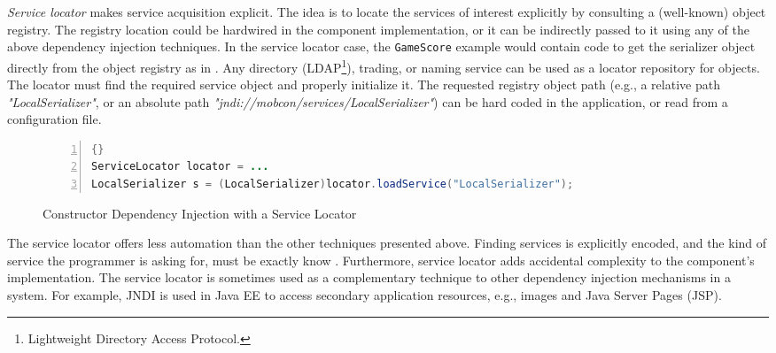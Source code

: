 \begin{dinglist}{43}

\item \textit{Service locator} makes service acquisition explicit. The idea is to locate the services of interest explicitly by consulting a (well-known) object registry. The registry location could be hardwired in the component implementation, or it can be indirectly passed to it using any of the above dependency injection techniques. In the service locator case, the  \texttt{Ga\-me\-Sco\-re} example would contain code to get the serializer object directly from the object registry as in . Any directory (LDAP\footnote{Lightweight Directory Access Protocol.}), trading, or naming service can be used as a locator repository for objects. The locator must find the required service object and properly initialize it. The requested registry object path (e.g., a relative path \textit{"Lo\-cal\-Se\-ria\-li\-zer"}, or an absolute path \textit{"jndi://mobcon/services/LocalSerializer"}) can be hard coded in the application, or read from a configuration file.

\begin{figure}[ht]
	\centering
	\begin{minipage}[b]{12cm}
	\begin{center}	
\begin{scriptsize}
\begin{lstlisting}[numbers=left,language=Java,frame=leftline]{}
ServiceLocator locator = ...
LocalSerializer s = (LocalSerializer)locator.loadService("LocalSerializer");
		\end{lstlisting}
		\end{scriptsize}
	\end{center}
	\caption{Constructor Dependency Injection with a Service Locator}
	\label{c2f:locator}
	\end{minipage}	
\end{figure}

The service locator offers less automation than the other techniques presented above. Finding services is explicitly encoded, and the kind of service the programmer is asking for, must be exactly know \cite{j2ee.without.ejb.04}. Furthermore, service locator adds accidental complexity to the component's implementation. The service locator is sometimes used as a complementary technique to other dependency injection mechanisms in a system. For example, JNDI \cite{www.jndi} is used in Java EE to access secondary application resources, e.g., images and Java Server Pages (JSP).


\end{dinglist}
